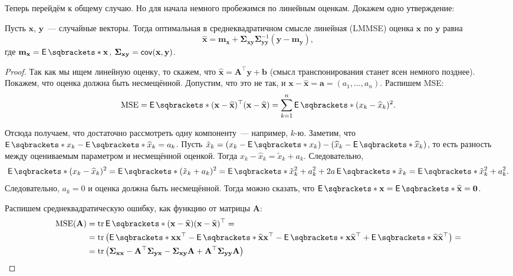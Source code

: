 Теперь перейдём к общему случаю. Но для начала немного пробежимся по линейным 
оценкам. Докажем одно утверждение:
\begin{theorem}
	Пусть \(\mathbf{x}\), \(\mathbf{y}\)~--- случайные векторы. Тогда 
	оптимальная в среднеквадратичном смысле линейная (LMMSE) оценка 
	\(\mathbf{x}\) по \(\mathbf{y}\) равна
	\[
		\hat{\mathbf{x}} = \mathbf{m}_{\mathbf{x}} + \bm{\Sigma}_{\mathbf{xy}} 
		\bm{\Sigma}_{\mathbf{yy}}^{-1}(\mathbf{y} - \mathbf{m}_{\mathbf{y}}),
	\]
	где \(\mathbf{m}_{\mathbf{x}} = \E{\mathbf{x}}\), 
	\(\bm{\Sigma}_{\mathbf{xy}} = \operatorname{\mathsf{cov}}(\mathbf{x}, \mathbf{y})\).
\end{theorem}
\begin{proof}
	Так как мы ищем линейную оценку, то скажем, что \(\hat{\mathbf{x}} = 
	\mathbf{A}^{\top}\mathbf{y} + \mathbf{b}\) (смысл транспонирования 
	станет ясен немного позднее). Покажем, что оценка должна быть 
	несмещённой. Допустим, что это не так, и \(\mathbf{x} - \hat{\mathbf{x}} = 
	\mathbf{a} = (a_{1}, \ldots, a_{n})\). Распишем MSE:
	\begin{align*}
		\mathrm{MSE} = \E{(\mathbf{x} - \hat{\mathbf{x}})^{\top} 
		(\mathbf{x} - \hat{\mathbf{x}})} = \sum_{k = 1}^{n} \E{(x_{k} - 
		\hat{x}_{k})^{2}}.
	\end{align*}
	
	Отсюда получаем, что достаточно рассмотреть одну компоненту~--- например, 
	\(k\)-ю. Заметим, что \(\E{x_{k}} - \E{\hat{x}_{k}} = a_{k}\). Пусть 
	\(\tilde{x}_{k} = (x_{k} - \E{x_{k}}) - (\hat{x}_{k} - \E{\hat{x}_{k}})\), 
	то есть разность между оцениваемым параметром и несмещённой оценкой. Тогда 
	\(x_{k} - \hat{x}_{k} = \tilde{x}_{k} + a_{k}\). Следовательно,
	\[
		\E{(x_{k} - \hat{x}_{k})^{2}} = \E{(\tilde{x}_{k} + a_{k})^{2}} = 
		\E{\tilde{x}_{k}^{2}} + a_{k}^{2} + 2a\E{\tilde{x}_{k}} = 
		\E{\tilde{x}_{k}^{2}} + a_{k}^{2}.
	\]
	Следовательно, \(a_{k} = 0\) и оценка должна быть несмещённой. Тогда можно 
	сказать, что \(\E{\mathbf{x}} = \E{\hat{\mathbf{x}}} = \mathbf{0}\).
	
	Распишем среднеквадратическую ошибку, как функцию от матрицы \(\mathbf{A}\):
	\begin{align*}
		\mathrm{MSE}(\mathbf{A}) &= \tr{\E{(\mathbf{x} - \hat{\mathbf{x}}) 
		(\mathbf{x} - \hat{\mathbf{x}})^{\top}}} = \\
		&= \tr\left(\E{\mathbf{xx}^{\top}} - 
		\E{\hat{\mathbf{x}}\mathbf{x}^{\top}} - 
		\E{\mathbf{x}\hat{\mathbf{x}}^{\top}} + 
		\E{\hat{\mathbf{x}}\hat{\mathbf{x}}^{\top}}\right) = \\
		&= \tr\left(\bm{\Sigma}_{\mathbf{xx}} - 
		\mathbf{A}^{\top}\bm{\Sigma}_{\mathbf{yx}} - 
		\bm{\Sigma}_{\mathbf{xy}}\mathbf{A} + 
		\mathbf{A}^{\top}\bm{\Sigma}_{\mathbf{yy}}\mathbf{A}\right)
	\end{align*}
	

\end{proof}
